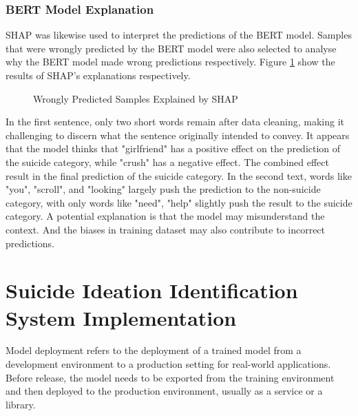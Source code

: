 \documentclass[ %
                    author={Bocheng Wang},
                supervisor={Dr. Qiang Liu},
                    degree={MSc},
                     title={A Research on Identification of Suicide Ideation in Texts with Multiple Models},
                      type={},
                      year={2024}]{dissertation}
\begin{document}
\subsection{BERT Model Explanation}
\noindent
SHAP was likewise used to interpret the predictions of the BERT model. Samples that were wrongly predicted by the BERT model were also selected to analyse why the BERT model made wrong predictions respectively. Figure \ref{fig:bertshap} show the results of SHAP's explanations respectively.

\begin{figure}[h]
      \centering
      \hfil
      \caption{Wrongly Predicted Samples Explained by SHAP}
      \label{fig:bertshap}
\end{figure}

In the first sentence, only two short words remain after data cleaning, making it challenging to discern what the sentence originally intended to convey. It appears that the model thinks that "girlfriend" has a positive effect on the prediction of the suicide category, while "crush" has a negative effect. The combined effect result in the final prediction of the suicide category. In the second text, words like "you", "scroll", and "looking" largely push the prediction to the non-suicide category, with only words like "need", "help" slightly push the result to the suicide category. A potential explanation is that the model may misunderstand the context. And the biases in training dataset may also contribute to incorrect predictions.


\chapter{Suicide Ideation Identification System Implementation}
\label{chap:implementation}
\noindent
Model deployment refers to the deployment of a trained model from a development environment to a production setting for real-world applications. Before release, the model needs to be exported from the training environment and then deployed to the production environment, usually as a service or a library. 
\end{document}
